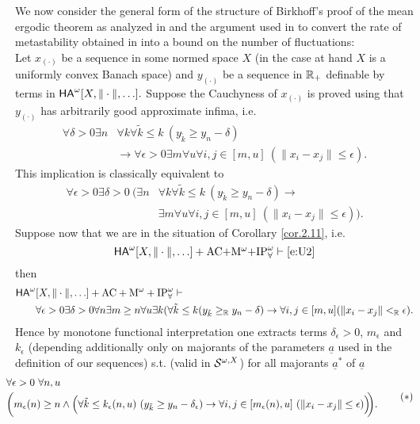 We now consider the general form of the structure of Birkhoff's proof 
of the mean ergodic theorem as analyzed in \cite{kohlenbachleustean09} and 
the argument used in \cite{Avigad/Rute} to convert the rate of metastability 
obtained in \cite{kohlenbachleustean09} into a bound on the number of 
fluctuations: \\[1mm]
Let $x_{(\cdot)}$ be a sequence in some normed space $X$ (in the case at hand 
$X$ is a uniformly convex Banach space) and $y_{(\cdot)}$ be a sequence in $\mathbb{R}_+$ definable by terms in ${\textsf{\upshape HA}}^\omega[X,\|\cdot\|,\ldots].$ 
Suppose the Cauchyness of $x_{(\cdot)}$ 
is proved using that $y_{(\cdot)}$ has arbitrarily good approximate 
infima, i.e.
\begin{align}
\forall \delta>0\exists n &\forall k \forall \tilde k\le k\ (y_{\tilde k}\geq y_n-\delta)\\
&\rightarrow \forall \epsilon>0\exists m \forall u \forall i,j\in[m,u]\ (\|x_i-x_j\|\leq \epsilon).
\end{align} 
This implication is classically equivalent to 
\begin{align*}
\forall \epsilon>0 \exists \delta>0\ \Big( \exists n &\forall k \forall \tilde 
k\le k\ (y_{\tilde k}\geq y_n-\delta)\rightarrow \\ \tag{+}\label{e:U2}
&\exists m \forall u \forall i,j\in[m,u]\ (\|x_i-x_j\|\leq \epsilon) \Big).
\end{align*}
Suppose now that we are in the situation of Corollary \ref{cor.2.11}, i.e.  
\[
{\textsf{\upshape HA}}^\omega[X,\|\cdot\|,\ldots]+\mbox{AC$+$M$^{\omega}+$IP}^{\omega}_{\forall} 
\vdash\text{\eqref{e:U2}}
\]
then
\begin{align*}
{\textsf{\upshape HA}}^\omega&[X,\|\cdot\|,\ldots]+{\rm AC}+{\rm M}^{\omega} +{\rm IP}^\omega_\forall \vdash\\
&\forall\epsilon>0\exists\delta>0\forall n\exists m\geq n\forall u\exists k(\forall \tilde k\le k(y_{\tilde k}\geq_{\mathbb{R}} y_n-\delta)
\rightarrow \forall i,j\in[m,u](\|x_i-x_j\|<_{\mathbb{R}}\epsilon).
\end{align*}
Hence by monotone functional interpretation one extracts terms 
 $\delta_\epsilon>0$, 
$m_\epsilon$ and $k_\epsilon$ (depending additionally only 
on majorants of the parameters $\underline{a}$ used in the definition of 
our sequences) s.t. (valid in 
${\cal S}^{\omega,X}$) for all majorants $\underline{a}^*$ of $\underline{a}$ 
\[ \hspace*{-5mm} \ba{l} 
\forall \epsilon>0\ \forall n,u\\[1mm] 
\bigg( m_\epsilon(n)\ge n \wedge \Big(\forall \tilde k\le k_\epsilon(n,u)\ (y_{\tilde k}\geq y_n-\delta_\epsilon)\rightarrow 
 \forall i,j\in[m_\epsilon(n),u]\ (\|x_i-x_j\|\leq \epsilon) \Big)
\hspace*{-1mm} \bigg).
\ea  \hspace*{-1mm}\tag{$*$}\label{e:U4-me}\]
